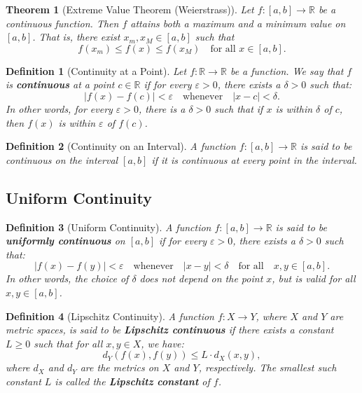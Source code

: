 \documentclass{article}
\newtheorem{definition}{Definition}
\newtheorem{theorem}{Theorem}
\begin{document}
\begin{theorem}[Extreme Value Theorem (Weierstrass)]
Let $f : [a, b] \to \mathbb{R}$ be a continuous function. Then $f$ attains both a maximum and a minimum value on $[a, b]$. That is, there exist $x_m, x_M \in [a, b]$ such that
\[
    f(x_m) \leq f(x) \leq f(x_M) \quad \text{for all } x \in [a, b].
\]
\end{theorem}

\begin{definition}[Continuity at a Point]
Let \( f : \mathbb{R} \to \mathbb{R} \) be a function. We say that \( f \) is \textbf{continuous} at a point \( c \in \mathbb{R} \) if for every \( \varepsilon > 0 \), there exists a \( \delta > 0 \) such that:
\[
|f(x) - f(c)| < \varepsilon \quad \text{whenever} \quad |x - c| < \delta.
\]
In other words, for every \( \varepsilon > 0 \), there is a \( \delta > 0 \) such that if \( x \) is within \( \delta \) of \( c \), then \( f(x) \) is within \( \varepsilon \) of \( f(c) \).
\end{definition}

\begin{definition}[Continuity on an Interval]
A function \( f : [a, b] \to \mathbb{R} \) is said to be continuous on the interval \( [a, b] \) if it is continuous at every point in the interval.
\end{definition}

\subsection*{Uniform Continuity}

\begin{definition}[Uniform Continuity]
A function \( f : [a, b] \to \mathbb{R} \) is said to be \textbf{uniformly continuous} on \( [a, b] \) if for every \( \varepsilon > 0 \), there exists a \( \delta > 0 \) such that:
\[
|f(x) - f(y)| < \varepsilon \quad \text{whenever} \quad |x - y| < \delta \quad \text{for all} \quad x, y \in [a, b].
\]
In other words, the choice of \( \delta \) does not depend on the point \( x \), but is valid for all \( x, y \in [a, b] \).
\end{definition}

\begin{definition}[Lipschitz Continuity]
A function \( f : X \to Y \), where \( X \) and \( Y \) are metric spaces, is said to be \textbf{Lipschitz continuous} if there exists a constant \( L \geq 0 \) such that for all \( x, y \in X \), we have:
\[
d_Y(f(x), f(y)) \leq L \cdot d_X(x, y),
\]
where \( d_X \) and \( d_Y \) are the metrics on \( X \) and \( Y \), respectively. The smallest such constant \( L \) is called the \textbf{Lipschitz constant} of \( f \).
\end{definition}
\end{document}
